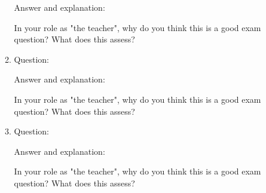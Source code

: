 \documentclass[12pt]{article}
\begin{document}
\begin{enumerate}
\begin{enumerate}
	Answer and explanation: \vfill
	
	In your role as "the teacher", why do you think this is a good exam question? What does this assess? \vfill
	
	\item Question: \vspace*{12pt}
	
	Answer and explanation: \vfill
	
	In your role as "the teacher", why do you think this is a good exam question? What does this assess? \vfill
	
	\item Question: \vspace*{12pt}
	
	Answer and explanation: \vfill
	
	In your role as "the teacher", why do you think this is a good exam question? What does this assess? \vfill
	
	\end{enumerate}

\end{enumerate}
\end{document}
